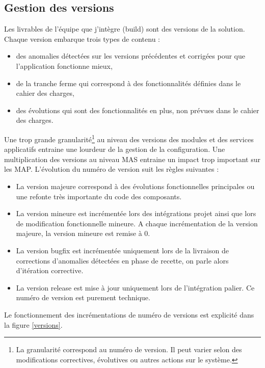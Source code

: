 \documentclass[12pt,a4paper]{article}
\begin{document}
\subsection{Gestion des versions}
Les livrables de l'équipe que j'intègre (build) sont des versions de la solution. Chaque version embarque trois types de contenu :
\smallbreak
\begin{itemize}
\item des anomalies détectées sur les versions précédentes et corrigées pour que l’application fonctionne mieux,
\item de la tranche ferme qui correspond à des fonctionnalités définies dans le cahier des charges,
\item des évolutions qui sont des fonctionnalités en plus, non prévues dans le cahier des charges.
\end{itemize}
\medbreak
Une trop grande granularité\footnote{La granularité correspond au numéro de version. Il peut varier selon des modifications correctives, évolutives ou autres actions sur le système.} au niveau des versions des modules et des services applicatifs entraine une lourdeur de la gestion de la configuration. Une multiplication des versions au niveau MAS entraine un impact trop important sur les MAP.
\newpage
\smallbreak
L’évolution du numéro de version suit les règles suivantes :
\smallbreak
\begin{itemize}
\item	La version majeure correspond à des évolutions fonctionnelles principales ou une refonte très importante du code des composants.
\item	La version mineure est incrémentée lors des intégrations projet ainsi que lors de modification fonctionnelle mineure. A chaque incrémentation de la version majeure, la version mineure est remise à 0. 
\item	La version bugfix est incrémentée uniquement lors de la livraison de corrections d’anomalies détectées en phase de recette, on parle alors d'itération corrective.
\item	La version release est mise à jour uniquement lors de l’intégration palier. Ce numéro de version est purement technique.
\end{itemize}
\medbreak
Le fonctionnement des incrémentations de numéro de versions est explicité dans la figure \ref{versions}.
\end{document}
